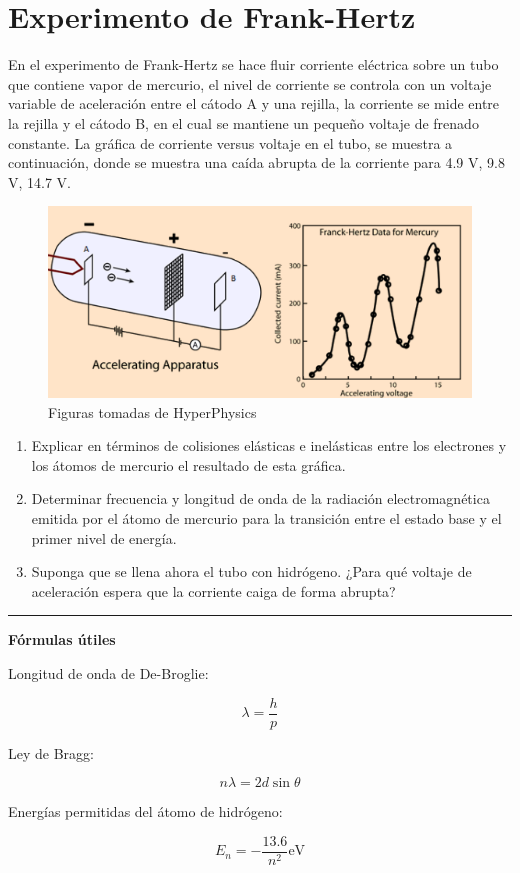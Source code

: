 \documentclass[12pt]{article}
\begin{document}
\section{Experimento de Frank-Hertz}

En el experimento de Frank-Hertz se hace fluir corriente eléctrica sobre un tubo que contiene
vapor de mercurio, el nivel de corriente se controla con un voltaje variable de aceleración entre el
cátodo A y una rejilla, la corriente se mide entre la rejilla y el cátodo B, en el cual se mantiene un
pequeño voltaje de frenado constante. La gráfica de corriente versus voltaje en el tubo, se muestra
a continuación, donde se muestra una caída abrupta de la corriente para 4.9 V, 9.8 V, 14.7 V.

	\begin{figure}[h!]
		\centering
	\includegraphics[scale=1, angle=0]{frank}
	\caption{Figuras tomadas de HyperPhysics}
\end{figure}

\begin{enumerate}
	\item Explicar en términos de colisiones elásticas e inelásticas entre los electrones y los átomos de
	mercurio el resultado de esta gráfica.
	\item  Determinar frecuencia y longitud de onda de la radiación electromagnética emitida por el átomo
	de mercurio para la transición entre el estado base y el primer nivel de energía.
	\item Suponga que se llena ahora el tubo con hidrógeno. ¿Para qué voltaje de aceleración espera que la
	corriente caiga de forma abrupta?
\end{enumerate}

\noindent\rule{16.5cm}{0.4pt}








\begin{center}
	\textbf{Fórmulas útiles}
\end{center}

Longitud de onda de De-Broglie:

\begin{equation*}
\lambda = \frac{h}{p}
\end{equation*}

Ley de Bragg:

\begin{equation}
n\lambda = 2 d \sin\theta
\end{equation}

Energías permitidas del átomo de hidrógeno:

\begin{equation*}
E_n = - \frac{13.6}{n^2} \text{eV}
\end{equation*}
\end{document}
